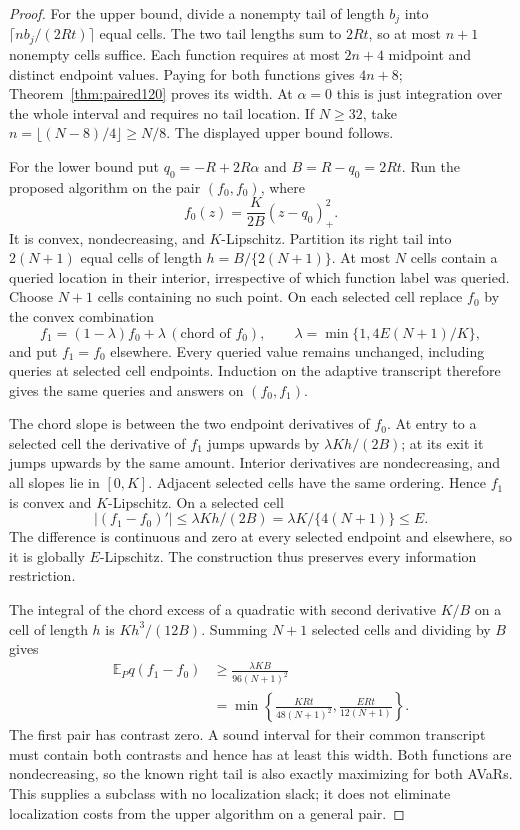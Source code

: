 \begin{proof}
For the upper bound, divide a nonempty tail of length $b_j$ into
$\lceil nb_j/(2Rt)\rceil$ equal cells.  The two tail lengths sum
to $2Rt$, so at most $n+1$ nonempty cells suffice.  Each function
requires at most $2n+4$ midpoint and distinct endpoint values.
Paying for both functions gives $4n+8$; Theorem~\ref{thm:paired120}
proves its width.  At $\alpha=0$ this is just integration over the
whole interval and requires no tail location.  If $N\ge32$, take
$n=\lfloor(N-8)/4\rfloor\ge N/8$.  The displayed upper bound
follows.

For the lower bound put $q_0=-R+2R\alpha$ and $B=R-q_0=2Rt$.
Run the proposed algorithm on the pair $(f_0,f_0)$, where
\[
 f_0(z)=\frac{K}{2B}(z-q_0)_+^2.
\]
It is convex, nondecreasing, and $K$-Lipschitz.  Partition its
right tail into $2(N+1)$ equal cells of length
$h=B/\{2(N+1)\}$.  At most $N$ cells contain a queried location
in their interior, irrespective of which function label was
queried.  Choose $N+1$ cells containing no such point.  On each
selected cell replace $f_0$ by the convex combination
\[
 f_1=(1-\lambda)f_0+\lambda\,(\text{chord of }f_0),
 \qquad
 \lambda=\min\{1,4E(N+1)/K\},
\]
and put $f_1=f_0$ elsewhere.
Every queried value remains unchanged, including queries at
selected cell endpoints.  Induction on the adaptive transcript
therefore gives the same queries and answers on $(f_0,f_1)$.

The chord slope is between the two endpoint derivatives of
$f_0$.  At entry to a selected cell the derivative of $f_1$
jumps upwards by $\lambda Kh/(2B)$; at its exit it jumps
upwards by the same amount.  Interior derivatives are
nondecreasing, and all slopes lie in $[0,K]$.  Adjacent selected
cells have the same ordering.  Hence $f_1$ is convex and
$K$-Lipschitz.  On a selected cell
\[
 |(f_1-f_0)'|\le\lambda Kh/(2B)
             =\lambda K/\{4(N+1)\}\le E.
\]
The difference is continuous and zero at every selected
endpoint and elsewhere, so it is globally $E$-Lipschitz.
The construction thus preserves every information restriction.

The integral of the chord excess of a quadratic with second
derivative $K/B$ on a cell of length $h$ is $Kh^3/(12B)$.
Summing $N+1$ selected cells and dividing by $B$ gives
\begin{align*}
 \mathbb E_Pq(f_1-f_0)
 &\ge\frac{\lambda KB}{96(N+1)^2}\\
 &=\min\left\{\frac{KRt}{48(N+1)^2},
                       \frac{ERt}{12(N+1)}\right\}.
\end{align*}
The first pair has contrast zero.  A sound interval for their
common transcript must contain both contrasts and hence has
at least this width.  Both functions are nondecreasing, so
the known right tail is also exactly maximizing for both
AVaRs.  This supplies a subclass with no localization slack;
it does not eliminate localization costs from the upper
algorithm on a general pair.
\end{proof}

